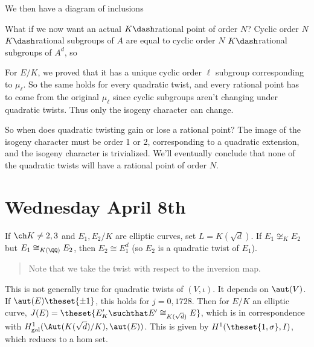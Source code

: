 We then have a diagram of inclusions

\begin{center}\end{center}

What if we now want an actual \(K\dash\)rational point of order \(N\)?
Cyclic order \(N\) \(K\dash\)rational subgroups of \(A\) are equal to
cyclic order \(N\) \(K\dash\)rational subgroups of \(A^d\), so

For \(E/K\), we proved that it has a unique cyclic order \(\ell\)
subgroup corresponding to \(\mu_\ell\). So the same holds for every
quadratic twist, and every rational point has to come from the original
\(\mu_\ell\) since cyclic subgroups aren't changing under quadratic
twists. Thus only the isogeny character can change.

So when does quadratic twisting gain or lose a rational point? The image
of the isogeny character must be order 1 or 2, corresponding to a
quadratic extension, and the isogeny character is trivialized. We'll
eventually conclude that none of the quadratic twists will have a
rational point of order \(N\).

\hypertarget{wednesday-april-8th}{%
\section{Wednesday April 8th}\label{wednesday-april-8th}}

\begin{description}
\tightlist
\item[Exercise]
If \(\ch K \neq 2,3\) and \(E_1, E_2/ K\) are elliptic curves, set
\(L = K(\sqrt{d})\). If \(E_1 \not\cong_K E_2\) but
\(E_1 \cong_{K(\QQ)} E_2\), then \(E_2 \cong E_1^d\) (so \(E_2\) is a
quadratic twist of \(E_1\)).
\end{description}

\begin{quote}
Note that we take the twist with respect to the inversion map.
\end{quote}

This is not generally true for quadratic twists of \((V, \iota)\). It
depends on \(\aut(V)\). If \(\aut(E) \theset{\pm 1}\), this holds for
\(j = 0 ,1728\). Then for \(E/K\) an elliptic curve,
\(J(E) = \theset{ E'_K \suchthat E' \cong_{K(\sqrt d)} E}\), which is in
correspondence with
\(H^1_{\text{gal}} (\Aut(K(\sqrt d) / K), \aut(E) )\). This is given by
\(H^1(\theset{1, \sigma}, I)\), which reduces to a hom set.

